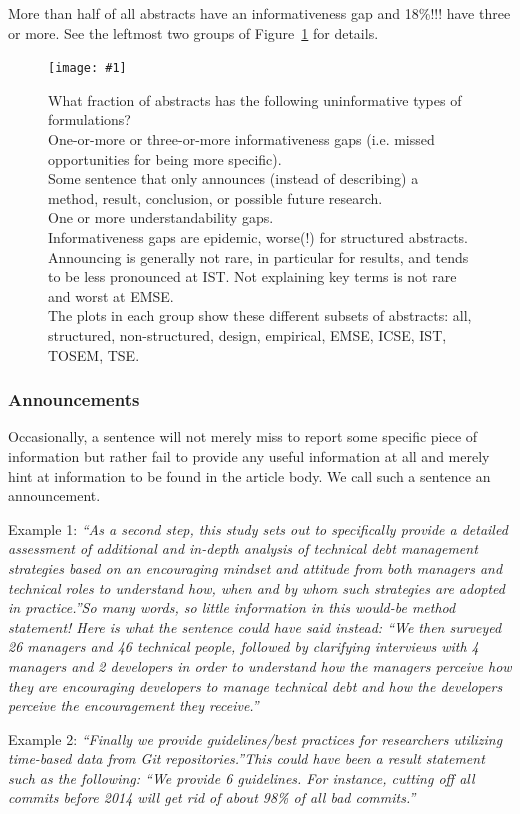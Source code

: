 \documentclass[10pt,journal,compsoc]{IEEEtran}
\newcommand{\Plotwide}[2]{%
	\begin{figure}[tbp]%
		\centering\texttt{[image: \#1]}%
		\vspace{-4mm}\caption{#2}\label{#1}%
    \end{figure}}
\newcommand{\Quote}[1]{\bgroup\itshape ``#1''\egroup}  %
\newcommand{\Pseudoquote}[1]{\bgroup\itshape ``#1''\egroup}  %
\newcommand{\Describegroups}{The plots in each group show these different subsets of abstracts:
	all, structured, non-structured, design, empirical, EMSE, ICSE, IST, TOSEM, TSE.}
\begin{document}
More than half of all abstracts have an informativeness gap
and 18\%!!! have three or more.
See the leftmost two groups of Figure~\ref{nonzerofractionbar_xletgroups_missinginfofractions} 
for details.

\Plotwide{nonzerofractionbar_xletgroups_missinginfofractions}{%
	What fraction of abstracts has the following uninformative types of formulations?\\
	One-or-more or three-or-more informativeness gaps (i.e. missed opportunities for being more specific).\\
	Some sentence that only announces (instead of describing) a method, result, conclusion, or 
	possible future research.\\
	One or more understandability gaps.\\
	Informativeness gaps are epidemic, worse(!) for structured abstracts.
	Announcing is generally not rare, in particular for results, and tends to be less pronounced
	at IST. 
	Not explaining key terms is not rare and worst at EMSE.\\
	\Describegroups}

\subsubsection{Announcements}

Occasionally, a sentence will not merely miss to report some specific piece of information
but rather fail to provide any useful information at all and merely hint at
information to be found in the article body.
We call such a sentence an announcement.

Example 1:
\Quote{As a second step, this study sets out to specifically
  provide a detailed assessment of additional and in-depth analysis of technical debt management strategies based
  on an encouraging mindset and attitude from both managers and technical roles to understand how, when and by
  whom such strategies are adopted in practice.} [BesMarBos22]
So many words, so little information in this would-be method statement!
Here is what the sentence could have said instead:
\Pseudoquote{We then surveyed 26 managers and 46 technical people, followed by clarifying interviews 
  with 4 managers and 2 developers in order to understand how the managers perceive how they are encouraging
  developers to manage technical debt and how the developers perceive the encouragement they receive.}

Example 2:
\Quote{Finally we provide guidelines/best practices for researchers utilizing time-based data
from Git repositories.} [FliChaDye22]  %
This could have been a result statement such as the following:
\Pseudoquote{We provide 6 guidelines. For instance, cutting off all commits before 2014
  will get rid of about 98\% of all bad commits.}
\end{document}

